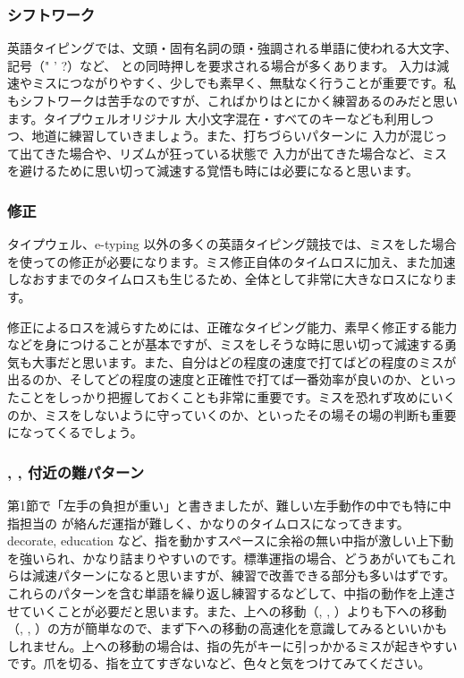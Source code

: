 \subsubsection*{シフトワーク}

英語タイピングでは、文頭・固有名詞の頭・強調される単語に使われる大文字、記号（" ' ?）など、 との同時押しを要求される場合が多くあります。 入力は減速やミスにつながりやすく、少しでも素早く、無駄なく行うことが重要です。私もシフトワークは苦手なのですが、こればかりはとにかく練習あるのみだと思います。タイプウェルオリジナル 大小文字混在・すべてのキーなども利用しつつ、地道に練習していきましょう。また、打ちづらいパターンに  入力が混じって出てきた場合や、リズムが狂っている状態で  入力が出てきた場合など、ミスを避けるために思い切って減速する覚悟も時には必要になると思います。

\subsubsection*{修正}

タイプウェル、e-typing 以外の多くの英語タイピング競技では、ミスをした場合  を使っての修正が必要になります。ミス修正自体のタイムロスに加え、また加速しなおすまでのタイムロスも生じるため、全体として非常に大きなロスになります。

修正によるロスを減らすためには、正確なタイピング能力、素早く修正する能力などを身につけることが基本ですが、ミスをしそうな時に思い切って減速する勇気も大事だと思います。また、自分はどの程度の速度で打てばどの程度のミスが出るのか、そしてどの程度の速度と正確性で打てば一番効率が良いのか、といったことをしっかり把握しておくことも非常に重要です。ミスを恐れず攻めにいくのか、ミスをしないように守っていくのか、といったその場その場の判断も重要になってくるでしょう。

\subsubsection*{, ,  付近の難パターン}

第1節で「左手の負担が重い」と書きましたが、難しい左手動作の中でも特に中指担当の    が絡んだ運指が難しく、かなりのタイムロスになってきます。decorate, education など、指を動かすスペースに余裕の無い中指が激しい上下動を強いられ、かなり詰まりやすいのです。標準運指の場合、どうあがいてもこれらは減速パターンになると思いますが、練習で改善できる部分も多いはずです。これらのパターンを含む単語を繰り返し練習するなどして、中指の動作を上達させていくことが必要だと思います。また、上への移動（, , ）よりも下への移動（, , ）の方が簡単なので、まず下への移動の高速化を意識してみるといいかもしれません。上への移動の場合は、指の先がキーに引っかかるミスが起きやすいです。爪を切る、指を立てすぎないなど、色々と気をつけてみてください。

